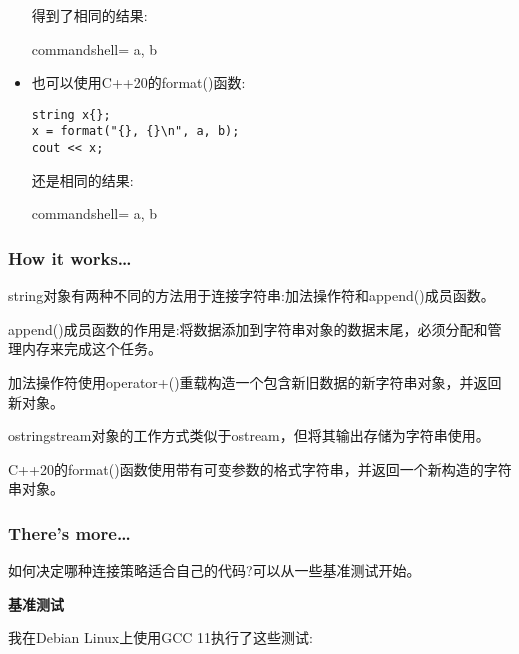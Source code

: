 \begin{itemize}
得到了相同的结果:

\begin{tcblisting}{commandshell={}}
a, b
\end{tcblisting}

\item 
也可以使用C++20的format()函数:

\begin{lstlisting}[style=styleCXX]
string x{};
x = format("{}, {}\n", a, b);
cout << x;
\end{lstlisting}

还是相同的结果:

\begin{tcblisting}{commandshell={}}
a, b
\end{tcblisting}

\end{itemize}

\subsubsection{How it works…}

string对象有两种不同的方法用于连接字符串:加法操作符和append()成员函数。

append()成员函数的作用是:将数据添加到字符串对象的数据末尾，必须分配和管理内存来完成这个任务。

加法操作符使用operator+()重载构造一个包含新旧数据的新字符串对象，并返回新对象。

ostringstream对象的工作方式类似于ostream，但将其输出存储为字符串使用。

C++20的format()函数使用带有可变参数的格式字符串，并返回一个新构造的字符串对象。

\subsubsection{There's more…}

如何决定哪种连接策略适合自己的代码?可以从一些基准测试开始。

\noindent
\textbf{基准测试}

我在Debian Linux上使用GCC 11执行了这些测试:

